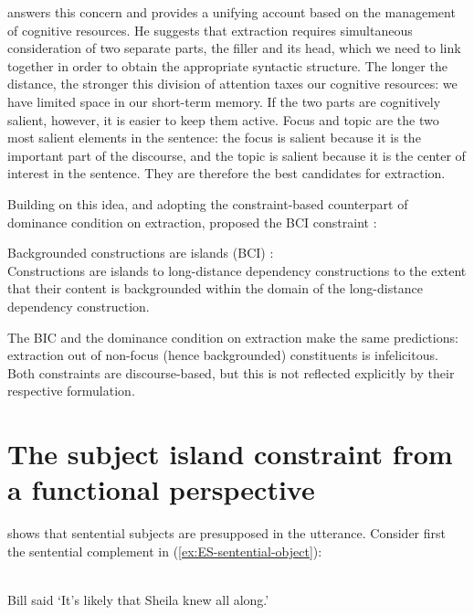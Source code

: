 \citet{Deane.1991} answers this concern and provides a unifying account based on the management of cognitive resources. He suggests that extraction requires simultaneous consideration of two separate parts, the filler and its head, which we need to link together in order to obtain the appropriate syntactic structure. The longer the distance, the stronger this division of attention taxes our cognitive resources: we have limited space in our short-term memory. If the two parts are cognitively salient, however, it is easier to keep them active. Focus and topic are the two most salient elements in the sentence: the focus is salient because it is the important part of the discourse, and the topic is salient because it is the center of interest in the sentence. They are therefore the best candidates for extraction. 

Building on this idea, and adopting the constraint-based counterpart of  \citet{Erteschik-Shir.1973} dominance condition on extraction, \citeauthor{Goldberg.2006} proposed the BCI constraint \citep[see also][]{Ambridge.2008,Goldberg.2013,Cuneo.2023}:

\ea Backgrounded constructions are islands (BCI) \citep[2]{Cuneo.2023}:\\
Constructions are islands to long-distance dependency constructions to the
extent that their content is backgrounded within the domain of
the long-distance dependency construction. 
\label{rule:BCI}
\z 

The BIC and the dominance condition on extraction make the same predictions: extraction out of non-focus (hence backgrounded) constituents is infelicitous. 
Both constraints are discourse-based, but this is not reflected explicitly by their respective formulation.

\section{The subject island constraint from a functional perspective}

\citet{Erteschik-Shir.1973} shows that sentential subjects are presupposed in the utterance. Consider first the sentential complement in (\ref{ex:ES-sentential-object}):

\begin{exe} 
\ex \citep[157]{Erteschik-Shir.1973}\\
Bill said `It's likely that Sheila knew all along.'
\label{ex:ES-sentential-object}
\begin{xlist}
\end{xlist}
\end{exe}

